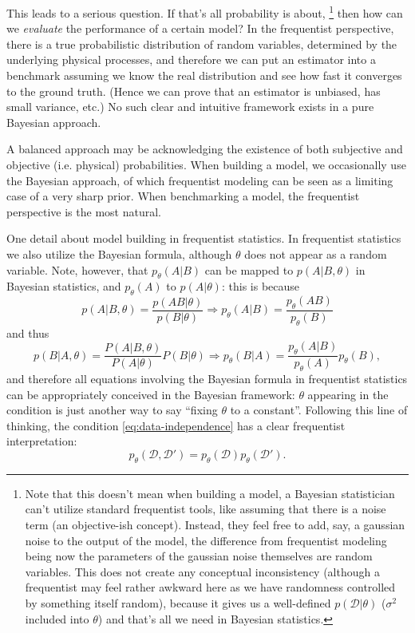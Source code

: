 \documentclass[hyperref, a4paper]{article}
\begin{document}
This leads to a serious question. If that's all probability is about,%
\footnote{
    Note that this doesn't mean when building a model,
    a Bayesian statistician can't utilize standard frequentist tools,
    like assuming that there is a noise term (an objective-ish concept).
    Instead, they feel free to add, say, a gaussian noise to the output of the model,
    the difference from frequentist modeling being now the parameters of the gaussian noise themselves are random variables.
    This does not create any conceptual inconsistency (although a frequentist may feel rather awkward here as we have randomness controlled by something itself random),
    because it gives us a well-defined $p(\mathcal{D} | \theta)$ ($\sigma^2$ included into $\theta$)
    and that's all we need in Bayesian statistics.
}
then how can we \emph{evaluate} the performance of a certain model?
In the frequentist perspective, there is a true probabilistic distribution of random variables,
determined by the underlying physical processes,
and therefore we can put an estimator into a benchmark assuming we know the real distribution
and see how fast it converges to the ground truth. 
(Hence we can prove that an estimator is unbiased, has small variance, etc.)
No such clear and intuitive framework exists in a pure Bayesian approach.

A balanced approach may be acknowledging the existence of both subjective and objective (i.e. physical) probabilities.
When building a model, we occasionally use the Bayesian approach,
of which frequentist modeling can be seen as a limiting case of a very sharp prior.
When benchmarking a model, the frequentist perspective is the most natural.

One detail about model building in frequentist statistics.
In frequentist statistics we also utilize the Bayesian formula,
although $\theta$ does not appear as a random variable.
Note, however, that $p_{\theta}(A | B)$ can be mapped to $p(A | B, \theta)$ in Bayesian statistics,
and $p_\theta(A)$ to $p(A | \theta)$:
this is because 
\begin{equation}
    p(A | B, \theta) = \frac{p(A B | \theta)}{p(B | \theta)} \Rightarrow
    p_\theta(A | B) = \frac{p_\theta(A B)}{p_\theta(B)}
    \label{eq:bayesian-frequentist}
\end{equation}
and thus 
\begin{equation}
    p(B | A, \theta) = \frac{P(A | B, \theta)}{P(A | \theta)} P (B | \theta) 
    \Rightarrow p_\theta(B | A) = \frac{p_\theta(A | B)}{p_\theta(A)} p_\theta(B),
\end{equation}
and therefore all equations involving the Bayesian formula in frequentist statistics
can be appropriately conceived in the Bayesian framework:
$\theta$ appearing in the condition is just another way to say ``fixing $\theta$ to a constant''.
Following this line of thinking, the condition \eqref{eq:data-independence} has a clear frequentist interpretation:
\begin{equation}
    p_\theta(\mathcal{D}, \mathcal{D}') = p_\theta(\mathcal{D}) p_\theta(\mathcal{D}').
\end{equation}
\end{document}
